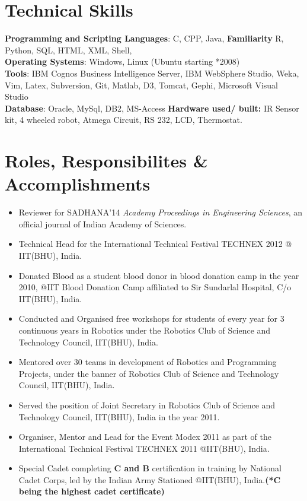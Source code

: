 \documentclass[margin,line]{res}
\begin{document}
\begin{resume}
\section{\sc Technical Skills}
{\bf Programming and Scripting Languages}:  C, CPP, Java, {\bf Familiarity} R, Python, SQL, HTML, XML, Shell, \\
{\bf Operating Systems}: Windows, Linux (Ubuntu starting *2008)\\
{\bf Tools}: IBM Cognos Business Intelligence Server, IBM WebSphere Studio, Weka, Vim, Latex, Subversion, Git, Matlab, D3, Tomcat, Gephi, Microsoft Visual Studio \\
{\bf Database}: Oracle, MySql, DB2, MS-Access 
{\bf Hardware used/ built:} IR Sensor kit, 4 wheeled robot, Atmega Circuit, RS 232, LCD, Thermostat.
\section{\sc Roles, Responsibilites \& Accomplishments}
\begin{itemize} %
  \setlength{\itemsep}{0.01pt}
  \setlength{\parskip}{0pt}
  \setlength{\parsep}{0pt}
  \item Reviewer for SADHANA'14 {\em Academy Proceedings in Engineering Sciences}, an official journal of Indian Academy of Sciences.
  \item Technical Head for the International Technical Festival TECHNEX 2012 @ IIT(BHU), India.
  \item Donated Blood as a student blood donor in blood donation camp in the year 2010, @IIT Blood Donation Camp affiliated to Sir Sundarlal Hospital, C/o IIT(BHU), India.
  \item Conducted and Organised free workshops for students of every year for 3 continuous years in Robotics under the Robotics Club of  Science and Technology Council, IIT(BHU), India.
  \item Mentored over 30 teams in development of Robotics and Programming Projects, under the banner of Robotics Club of  Science and Technology Council, IIT(BHU), India.
  \item Served the position of Joint Secretary in  Robotics Club of  Science and Technology Council, IIT(BHU), India in the year 2011.
  \item Organiser, Mentor and Lead for the Event Modex 2011 as part of the International Technical Festival TECHNEX 2011 @IIT(BHU), India.
  \item Special Cadet completing {\bf C and B} certification in training by National Cadet Corps, led by the Indian Army Stationed @IIT(BHU), India.{\bf(*C being the highest cadet certificate)} 
\end{itemize}


\end{resume}
\end{document}
